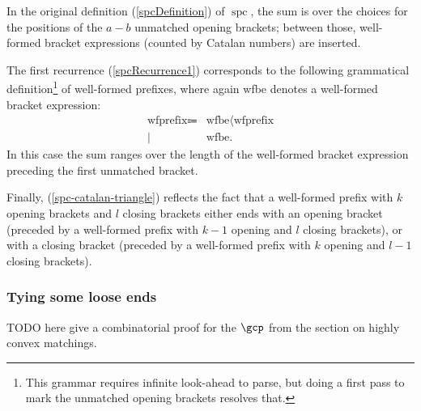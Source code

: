 \documentclass[10pt, a4paper, twoside]{basestyle}
\DeclareMathOperator{\spc}{spc}
\begin{document}
In the original definition (\ref{spcDefinition}) of $\spc$, the sum is over the choices for the positions of the
$a-b$ unmatched opening brackets; between those, well-formed bracket expressions (counted by Catalan numbers) are
inserted.

The first recurrence (\ref{spcRecurrence1}) corresponds to the following grammatical
definition\footnote{This grammar requires infinite look-ahead to parse, but doing a first pass to mark the
unmatched opening brackets resolves that.} of well-formed
prefixes, where again wfbe denotes a well-formed bracket expression:
\begin{align*}
\text{wfprefix} \Coloneq
& \text{wfbe} \langle \text{wfprefix} \\
\mid\: & \text{wfbe}.
\end{align*}
In this case the sum ranges over the length of the well-formed bracket expression preceding the first unmatched bracket.

Finally, (\ref{spc-catalan-triangle}) reflects the fact that a well-formed prefix with $k$ opening brackets
and $l$ closing brackets either ends with an opening bracket (preceded by a well-formed prefix with $k-1$ opening
and $l$ closing brackets), or with a closing bracket (preceded by a well-formed prefix with $k$ opening
and $l-1$ closing brackets).
\subsubsection{Tying some loose ends}
TODO here give a combinatorial proof for the $\gcp$ from the section on highly convex matchings.
\end{document}
